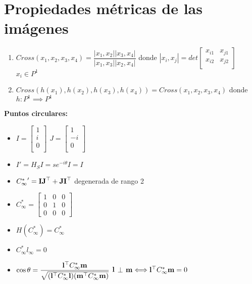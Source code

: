 \documentclass[12pt,a4paper]{article}
\begin{document}
\section{Propiedades m\'etricas de las im\'agenes}

\begin{enumerate}
	\item $Cross(x_{1}, x_{2}, x_{3}, x_{4}) = \dfrac{|x_{1},x_{2}||x_{3},x_{4}|}{|x_{1},x_{3}||x_{2},x_{4}|}$ donde $|x_{i},x_{j}| = det \left[ {\begin{smallmatrix}
	 x_{i1} & x_{j1}\\
	 x_{i2} & x_{j2} \\
	\end{smallmatrix} } \right]$ $x_{i} \in P^{1}$

\item $Cross(h(x_{1}), h(x_{2}), h(x_{3}), h(x_{4})) = Cross(x_{1}, x_{2}, x_{3}, x_{4})$ donde $h:P^{1} \implies P^{1}$
\end{enumerate}

{\bf Puntos circulares:}

\begin{itemize}
	\item $I = \left[ {\begin{smallmatrix}
	 1\\
	 i\\
	 0\\
	\end{smallmatrix} } \right]$
	$J = \left[ {\begin{smallmatrix}
	 1\\
	 -i\\
	 0\\
	\end{smallmatrix} } \right]$

	\item $I' = H_{S}I = se^{-i\theta}I = I$

	\item ${C^{*}_{\infty}}' = {\bf IJ}^{\top} + {\bf JI}^{\top}$ degenerada de rango 2

	\item $
	{C^{*}_{\infty}} =
	\left[ {\begin{smallmatrix}
	 1 & 0 & 0 \\
	 0 & 1 & 0 \\
	 0 & 0 & 0
	\end{smallmatrix} } \right]
	$


	\item $H({C^{*}_{\infty}}) = {C^{*}_{\infty}}$

	\item ${C^{*}_{\infty}} l_{\infty} = 0$

	\item $\cos{\theta} = \dfrac{{\bf l}^{\top} {C^{*}_{\infty}} {\bf m}}
	{\sqrt{({\bf l}^{\top} {C^{*}_{\infty}} {\bf l})({\bf m}^{\top} {C^{*}_{\infty}} {\bf m}) }}$ \hspace{2cm} ${\bf l}$ $\bot$ ${\bf m} \Longleftrightarrow {\bf l}^{\top} {C^{*}_{\infty}} {\bf m} = 0$

\end{itemize}
\end{document}
